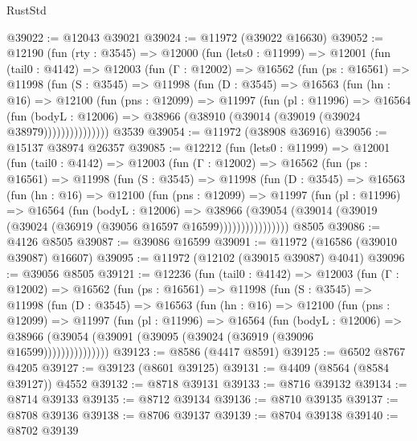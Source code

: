 \begin{lexlean}{RustStd}
\begin{coremodule}
@39022 := @12043 @39021
@39024 := @11972 (@39022 @16630)
@39052 := @12190
    (fun (rty : @3545) =>
    @12000
      (fun (lets0 : @11999) =>
      @12001
        (fun (tail0 : @4142) =>
        @12003
          (fun (Γ : @12002) =>
          @16562
            (fun (ps : @16561) =>
            @11998
              (fun (S : @3545) =>
              @11998
                (fun (D : @3545) =>
                @16563
                  (fun (hn : @16) =>
                  @12100
                    (fun (pns : @12099) =>
                    @11997
                      (fun (pl : @11996) =>
                      @16564
                        (fun (bodyL : @12006) =>
                        @38966 (@38910 (@39014 (@39019 (@39024 @38979)))))))))))))))
    @3539
@39054 := @11972 (@38908 @36916)
@39056 := @15137 @38974 @26357
@39085 := @12212
    (fun (lets0 : @11999) =>
    @12001
      (fun (tail0 : @4142) =>
      @12003
        (fun (Γ : @12002) =>
        @16562
          (fun (ps : @16561) =>
          @11998
            (fun (S : @3545) =>
            @11998
              (fun (D : @3545) =>
              @16563
                (fun (hn : @16) =>
                @12100
                  (fun (pns : @12099) =>
                  @11997
                    (fun (pl : @11996) =>
                    @16564
                      (fun (bodyL : @12006) =>
                      @38966
                        (@39054
                          (@39014 (@39019 (@39024 (@36919 (@39056 @16597 @16599))))))))))))))))
    @8505
@39086 := @4126 @8505
@39087 := @39086 @16599
@39091 := @11972 (@16586 (@39010 @39087) @16607)
@39095 := @11972 (@12102 (@39015 @39087) @4041)
@39096 := @39056 @8505
@39121 := @12236
    (fun (tail0 : @4142) =>
    @12003
      (fun (Γ : @12002) =>
      @16562
        (fun (ps : @16561) =>
        @11998
          (fun (S : @3545) =>
          @11998
            (fun (D : @3545) =>
            @16563
              (fun (hn : @16) =>
              @12100
                (fun (pns : @12099) =>
                @11997
                  (fun (pl : @11996) =>
                  @16564
                    (fun (bodyL : @12006) =>
                    @38966 (@39054 (@39091 (@39095 (@39024 (@36919 (@39096 @16599)))))))))))))))
@39123 := @8586 (@4417 @8591)
@39125 := @6502 @8767 @4205
@39127 := @39123 (@8601 @39125)
@39131 := @4409 (@8564 (@8584 @39127)) @4552
@39132 := @8718 @39131
@39133 := @8716 @39132
@39134 := @8714 @39133
@39135 := @8712 @39134
@39136 := @8710 @39135
@39137 := @8708 @39136
@39138 := @8706 @39137
@39139 := @8704 @39138
@39140 := @8702 @39139

\end{coremodule}
\end{lexlean}
